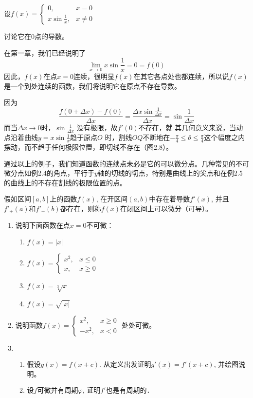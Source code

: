 \begin{example}
设$f(x)=\begin{cases}
    0,& x=0\\
    x\sin\frac{1}{x},& x\ne 0
\end{cases}$

讨论它在0点的导数。
\end{example}

\begin{solution}
在第一章，我们已经说明了
\[\lim_{x\to 0}x\sin\frac{1}{x}=0=f(0)\]
因此，$f(x)$在点$x=0$连续，很明显$f(x)$在其它各点处也都连续，所以说$f(x)$是一个到处连续的函数，我们将说明它在原点不存在导数。

因为
\[\frac{f(0+\Delta x)-f(0)}{\Delta x}=\frac{\Delta x\sin\frac{1}{\Delta x}}{\Delta x}=\sin\frac{1}{\Delta x}\]
而当$\Delta x\to 0$时，$\sin\frac{1}{\Delta x}$
没有极限，故$f'(0)$不存在，就
其几何意义来说，当动点沿着曲线$y=x\sin\frac{1}{x}$趋于原点$O$
时，割线$OQ$不断地在$-\frac{\pi}{4}\le \theta\le \frac{\pi}{4}$这个幅度之内摆动，而不趋于任何极限位置，即切线不存在（图2.8）。
\end{solution}

通过以上的例子，我们知道函数的连续点未必是它的可以微分点。几种常见的不可微分点如例2.4的角点，平行于$y$轴的切线的切点，特别是曲线上的尖点和在例2.5的曲线上的不存在割线的极限位置的点。

假如区间$[a,b]$上的函数$f(x)$, 在开区间$(a,b)$中存在着导数$f'(x)$, 并且$f'_+(a)$和$f'_-(b)$都存在，则称$f(x)$在闭区间上可以微分（可导）。

\begin{ex}
\begin{enumerate}
    \item 说明下面函数在点$x=0$不可微：
\begin{multicols}{2}
\begin{enumerate}
    \item $f(x)=|x|$
    \item $f(x)=\begin{cases}
        x^2,& x\le 0\\
        x,& x\ge 0
    \end{cases}$
    \item $f(x)=\sqrt[3]{x}$
    \item $f(x)=\sqrt{|x|}$
\end{enumerate}
\end{multicols}
\item 说明函数$f(x)=\begin{cases}
    x^2,& x\ge 0\\
    -x^2,& x<0
\end{cases}$
    处处可微。
\item \begin{enumerate}
\item 假设$g(x)=f(x+c)$. 从定义出发证明$g'(x)=f'(x+c)$, 并绘图说明。    
\item 设$f$可微并有周期$\varphi$, 证明$f'$也是有周期的．
\end{enumerate}

\end{enumerate}
\end{ex}


